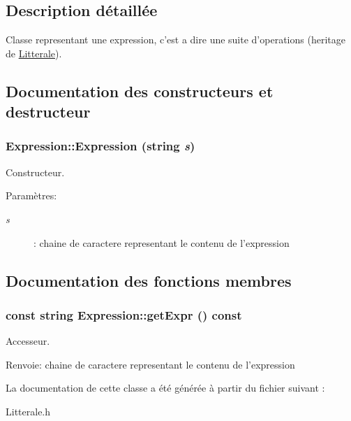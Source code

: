 \subsection{Description détaillée}
Classe representant une expression, c'est a dire une suite d'operations (heritage de \hyperlink{class_litterale}{Litterale}). 

\subsection{Documentation des constructeurs et destructeur}
\hypertarget{class_expression_63fded6eef43b0507d9d2bd4c7fae0f9}{
\subsubsection[{Expression}]{\setlength{\rightskip}{0pt plus 5cm}Expression::Expression (string {\em s})}}
\label{class_expression_63fded6eef43b0507d9d2bd4c7fae0f9}


Constructeur. 

\begin{Desc}
\item[Paramètres:]
\begin{description}
\item[{\em s}]: chaine de caractere representant le contenu de l'expression \end{description}
\end{Desc}


\subsection{Documentation des fonctions membres}
\hypertarget{class_expression_392af96c64d27d5aa23bc3993fa40a62}{
\subsubsection[{getExpr}]{\setlength{\rightskip}{0pt plus 5cm}const string Expression::getExpr () const}}
\label{class_expression_392af96c64d27d5aa23bc3993fa40a62}


Accesseur. 

\begin{Desc}
\item[Renvoie:]chaine de caractere representant le contenu de l'expression \end{Desc}


La documentation de cette classe a été générée à partir du fichier suivant :\begin{CompactItemize}
\item 
Litterale.h\end{CompactItemize}
